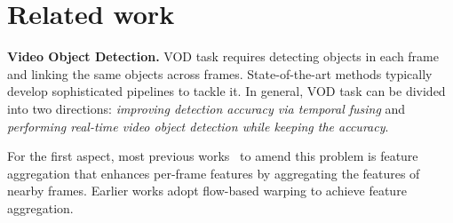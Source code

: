 \documentclass[10pt,journal,compsoc]{IEEEtran}
\begin{document}
\section{Related work}
\label{sec:related}
\noindent
\textbf{Video Object Detection.} VOD task requires detecting objects in each frame and linking the same objects across frames. State-of-the-art methods typically develop sophisticated pipelines to tackle it. In general, VOD task can be divided into two directions: \textit{improving detection accuracy via temporal fusing} and \textit{performing real-time video object detection while keeping the accuracy}. 

For the first aspect, most previous works~\cite{yao2020video,jiang2020learning,han2020mining,han2020exploiting,lin2020dual,he2020temporal,chen2018optimizing,chen2020memory,sun2021mamba,guo2019progressive,zhu17fgfa,zhu18hp,wang18manet} to amend this problem is feature aggregation that enhances per-frame features by aggregating the features of nearby frames. Earlier works adopt flow-based warping to achieve feature aggregation. 
\end{document}
